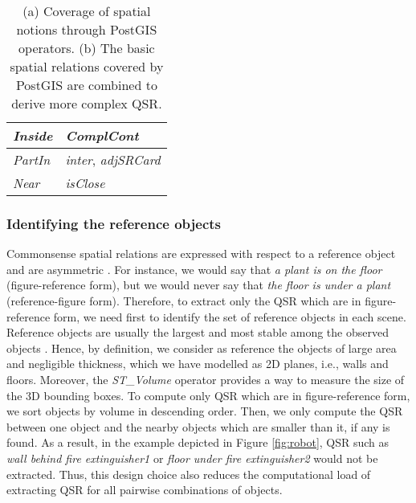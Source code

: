 \documentclass{article}
\begin{document}
\begin{table*}[t]
\begin{subtable}[t]{0.35\textwidth}
\begin{tabular}{l | l  }
        \textit{Inside} & \textit{ComplCont} \\ \hline
        \textit{PartIn} & \textit{inter}, \textit{adjSRCard}  \\\hline
        \textit{Near} & \textit{isClose} \\ \hline
        \end{tabular}
        \caption{}
        \label{tab:combo}
     \end{subtable}
     \caption{(a) Coverage of spatial notions through PostGIS operators. (b) The basic spatial relations covered by PostGIS are combined to derive more complex QSR.}
     \label{tab:temps}
\end{table*}
\subsubsection{Identifying the reference objects}  Commonsense spatial relations are expressed with respect to a reference object and are asymmetric \cite{landau_what_1993}. For instance, we would say that \textit{a plant is on the floor} (figure-reference form), but we would never say that \textit{the floor is under a plant} (reference-figure form). Therefore, to extract only the QSR which are in figure-reference form, we need first to identify the set of reference objects in each scene. Reference objects are usually the largest and most stable among the observed objects \cite{landau_what_1993}. Hence, by definition, we consider as reference the objects of large area and negligible thickness, which we have modelled as 2D planes, i.e., walls and floors. Moreover, the \textit{ST\_Volume} operator provides a way to measure the size of the 3D bounding boxes. To compute only QSR which are in figure-reference form, we sort objects by volume in descending order. Then, we only compute the QSR between one object and the nearby objects which are smaller than it, if any is found. As a result, in the example depicted in Figure \ref{fig:robot}, QSR such as \textit{wall behind fire extinguisher1} or \textit{floor under fire extinguisher2} would not be extracted. Thus, this design choice also reduces the computational load of extracting QSR for all pairwise combinations of objects.  
\end{document}

